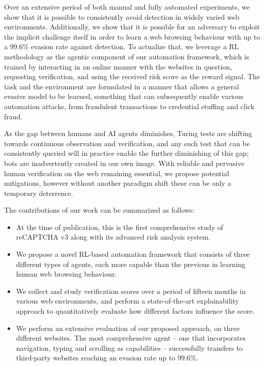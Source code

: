 Over an extensive period of both manual and fully automated experiments, we show that it is possible to consistently avoid detection in widely varied web environments.
Additionally, we show that it is possible for an adversary to exploit the implicit challenge itself in order to learn a web browsing behaviour with up to a 99.6\% evasion rate against detection.
To actualize that, we leverage a \gls{RL} methodology as the agentic component of our automation framework, which is trained by interacting in an online manner with the websites in question, requesting verification, and using the received risk score as the reward signal.
The task and the environment are formulated in a manner that allows a general evasive model to be learned, something that can subsequently enable various automation attacks, from fraudulent transactions to credential stuffing and click fraud.

As the gap between humans and AI agents diminishes, Turing tests are shifting towards continuous observation and verification, and any such test that can be consistently queried will in practice enable the further diminishing of this gap; bots are inadvertently created in our own image.
With reliable and pervasive human verification on the web remaining essential, we propose potential mitigations, however without another paradigm shift these can be only a temporary deterrence.

The contributions of our work can be summarized as follows:
\begin{itemize}
\item At the time of publication, this is the first comprehensive study of reCAPTCHA v3 along with its advanced risk analysis system.
\item We propose a novel RL-based automation framework that consists of three different types of agents, each more capable than the previous in learning human web browsing behaviour.
\item We collect and study verification scores over a period of fifteen months in various web environments, and perform a state-of-the-art explainability approach to quantitatively evaluate how different factors influence the score.
\item We perform an extensive evaluation of our proposed approach, on three different websites.
The most comprehensive agent -- one that incorporates navigation, typing and scrolling as capabilities -- successfully transfers to third-party websites reaching an evasion rate up to 99.6\%.
\end{itemize}


